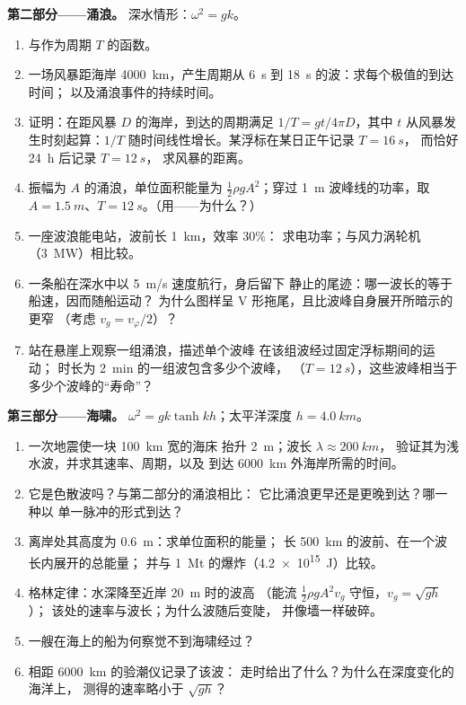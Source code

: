 \begin{problem}
\medskip
\noindent\textbf{第二部分——涌浪。}
深水情形：$\omega^2 = gk$。
\begin{enumerate}[resume]
  \item {}与作为周期 $T$ 的函数。
  \item 一场风暴距海岸 \qty{4000}{km}，产生周期从
        \qty{6}{s} 到 \qty{18}{s} 的波：求每个极值的到达时间；
        以及涌浪事件的持续时间。
  \item 证明：在距风暴 $D$ 的海岸，到达的周期满足
        $1/T = gt/4\pi D$，其中 $t$ 从风暴发生时刻起算：$1/T$
        随时间线性增长。某浮标在某日正午记录 $T = \qty{16}{s}$，
        而恰好 \qty{24}{h} 后记录 $T = \qty{12}{s}$，
        求风暴的距离。
  \item 振幅为 $A$ 的涌浪，单位面积能量为 $\tfrac12\rho
        gA^2$；穿过 \qty{1}{m} 波峰线的功率，取 $A =
        \qty{1.5}{m}$、$T = \qty{12}{s}$。（用——为什么？）
  \item 一座波浪能电站，波前长 \qty{1}{km}，效率 $30\%$：
        求电功率；与风力涡轮机（\qty{3}{MW}）相比较。
  \item 一条船在深水中以 \qty{5}{m/s} 速度航行，身后留下
        静止的尾迹：哪一波长的等于船速，因而随船运动？
        为什么图样呈
        V 形拖尾，且比波峰自身展开所暗示的更窄
        （考虑 $v_g = v_\varphi/2$）？
  \item 站在悬崖上观察一组涌浪，描述单个波峰
        在该组波经过固定浮标期间的运动；
        时长为 \qty{2}{min} 的一组波包含多少个波峰，
        （$T = \qty{12}{s}$），这些波峰相当于
        多少个波峰的“寿命”？
\end{enumerate}

\medskip
\noindent\textbf{第三部分——海啸。}
$\omega^2 = gk\tanh kh$；太平洋深度 $h = \qty{4.0}{km}$。
\begin{enumerate}[resume]
  \item 一次地震使一块 \qty{100}{km} 宽的海床
        抬升 \qty{2}{m}；波长 $\lambda \approx \qty{200}{km}$，
        验证其为浅水波，并求其速率、周期，以及
        到达 \qty{6000}{km} 外海岸所需的时间。
  \item 它是色散波吗？与第二部分的涌浪相比：
        它比涌浪更早还是更晚到达？哪一种以
        单一脉冲的形式到达？
  \item 离岸处其高度为 \qty{0.6}{m}：求单位面积的能量；
        长 \qty{500}{km} 的波前、在一个波长内展开的总能量；
        并与 \qty{1}{Mt} 的爆炸（\qty{4.2e15}{J}）比较。
  \item 格林定律：水深降至近岸 \qty{20}{m} 时的波高
        （能流 $\tfrac12\rho gA^2v_g$ 守恒，$v_g = \sqrt{gh}$）；
        该处的速率与波长；为什么波随后变陡，
        并像墙一样破碎。
  \item 一艘在海上的船为何察觉不到海啸经过？
  \item 相距 \qty{6000}{km} 的验潮仪记录了该波：
        走时给出了什么？为什么在深度变化的海洋上，
        测得的速率略小于 $\sqrt{gh}$？
\end{enumerate}


\end{problem}
